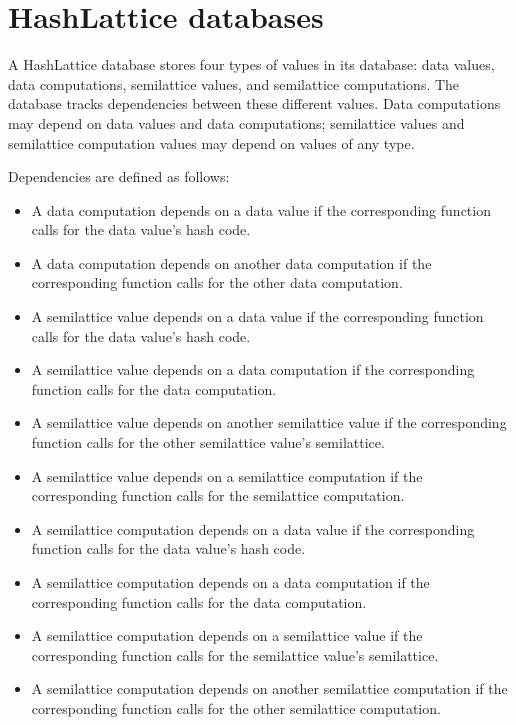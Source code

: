 \documentclass{article}
\begin{document}
  \section{HashLattice databases}

    A HashLattice database stores four types of values in its database: data values, data computations, semilattice values, and semilattice computations. The database tracks dependencies between these different values. Data computations may depend on data values and data computations; semilattice values and semilattice computation values may depend on values of any type.

    Dependencies are defined as follows:
    \begin{itemize}
      \item A data computation depends on a data value if the corresponding \evaldatacomputation{} function calls \hashlookup{} for the data value's hash code.
      \item A data computation depends on another data computation if the corresponding \evaldatacomputation{} function calls \datacomputationlookup{} for the other data computation.
      \item A semilattice value depends on a data value if the corresponding \checkelem{} function calls \hashlookup{} for the data value's hash code.
      \item A semilattice value depends on a data computation if the corresponding \checkelem{} function calls \datacomputationlookup{} for the data computation.
      \item A semilattice value depends on another semilattice value if the corresponding \checkelem{} function calls \latticelookup{} for the other semilattice value's semilattice.
      \item A semilattice value depends on a semilattice computation if the corresponding \checkelem{} function calls \latticecomputationlookup{} for the semilattice computation.
      \item A semilattice computation depends on a data value if the corresponding \evallatticecomputation{} function calls \hashlookup{} for the data value's hash code.
      \item A semilattice computation depends on a data computation if the corresponding \evallatticecomputation{} function calls \datacomputationlookup{} for the data computation.
      \item A semilattice computation depends on a semilattice value if the corresponding \evallatticecomputation{} function calls \latticelookup{} for the semilattice value's semilattice.
      \item A semilattice computation depends on another semilattice computation if the corresponding \evallatticecomputation{} function calls \latticecomputationlookup{} for the other semilattice computation.
    \end{itemize}
\end{document}
